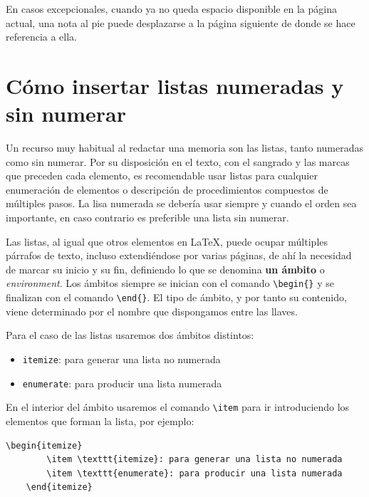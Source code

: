 En casos excepcionales, cuando ya no queda espacio disponible en la página actual, una nota al pie puede desplazarse a la página siguiente de donde se hace referencia a ella.

\section{Cómo insertar listas numeradas y sin numerar}

Un recurso muy habitual al redactar una memoria son las listas, tanto numeradas como sin numerar. Por su disposición en el texto, con el sangrado y las marcas que preceden cada elemento, es recomendable usar listas para cualquier enumeración de elementos o descripción de procedimientos compuestos de múltiples pasos. La lisa numerada se debería usar siempre y cuando el orden sea importante, en caso contrario es preferible una lista sin numerar.

Las listas, al igual que otros elementos en \LaTeX, puede ocupar múltiples párrafos de texto, incluso extendiéndose por varias páginas, de ahí la necesidad de marcar su inicio y su fin, definiendo lo que se denomina \textbf{un ámbito} o \textit{environment}. Los ámbitos siempre se inician con el comando \verb|\begin{}| y se finalizan con el comando \verb|\end{}|. El tipo de ámbito, y por tanto su contenido, viene determinado por el nombre que dispongamos entre las llaves.

Para el caso de las listas usaremos dos ámbitos distintos:
    \begin{itemize}
        \item \verb|itemize|: para generar una lista no numerada
        \item \verb|enumerate|: para producir una lista numerada
    \end{itemize}

En el interior del ámbito usaremos el comando \verb|\item| para ir introduciendo los elementos que forman la lista, por ejemplo:

\begin{lstlisting}[language={[LaTeX]TeX},caption={Creación de una lista no numerada con dos elementos},label=List.Itemize]
    \begin{itemize}
        \item \texttt{itemize}: para generar una lista no numerada
        \item \texttt{enumerate}: para producir una lista numerada
    \end{itemize}
\end{lstlisting}

